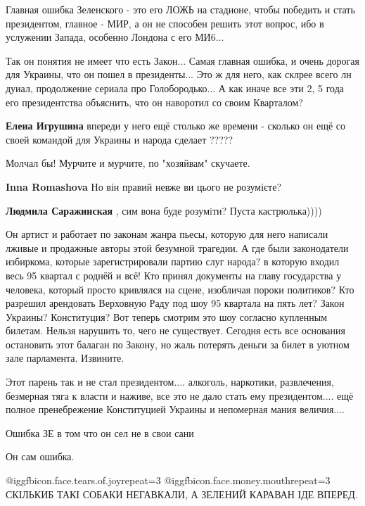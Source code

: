 \begin{itemize}
Главная ошибка Зеленского - это его ЛОЖЬ на стадионе, чтобы победить и стать
президентом, главное - МИР, а он не способен решить этот вопрос, ибо в
услужении Запада, особенно Лондона с его МИ6...


Так он понятия не имеет что есть Закон... Самая главная ошибка, и очень дорогая
для Украины, что он пошел в президенты... Это ж для него, как склрее всего лн
дуиал, продолжение сериала про Голобородько... А как иначе все эти 2, 5 года его
президентства объяснить, что он наворотил со своим Кварталом?

\begin{itemize} %
\textbf{Елена Игрушина} впереди у него ещё столько же времени - сколько он ещё со своей командой для Украины и народа сделает ?????
\end{itemize} %

Молчал бы! Мурчите и мурчите, по "хозяйвам" скучаете.

\begin{itemize} %
\textbf{Inna Romashova} Но він правий невже ви цього не розумієте?


\textbf{Людмила Саражинская} , сим вона буде розумiти? Пуста кастрюлька))))
\end{itemize} %


Он артист и работает по законам жанра пьесы, которую для него написали лживые и
продажные авторы этой безумной трагедии. А где были законодатели избиркома,
которые зарегистрировали партию слуг народа? в которую входил весь 95 квартал с
роднёй и всё! Кто принял документы на главу государства у человека, который
просто кривлялся на сцене, изобличая пороки политиков? Кто разрешил арендовать
Верховную Раду под шоу 95 квартала на пять лет? Закон Украины? Конституция? Вот
теперь смотрим это шоу согласно купленным билетам. Нельзя нарушить то, чего не
существует. Сегодня есть все основания остановить этот балаган по Закону, но
жаль потерять деньги за билет в уютном зале парламента. Извините.



Этот парень так и не стал президентом.... алкоголь, наркотики, развлечения,
безмерная тяга к власти и наживе, все это не дало стать ему президентом.... ещё
полное пренебрежение Конституцией Украины и непомерная мания величия....

Ошибка ЗЕ в том что он сел не в свои сани

Он сам ошибка.


 @igg{fbicon.face.tears.of.joy}{repeat=3}
 @igg{fbicon.face.money.mouth}{repeat=3} СКІЛЬКИБ ТАКІ СОБАКИ НЕГАВКАЛИ, А
 ЗЕЛЕНИЙ КАРАВАН ІДЕ ВПЕРЕД.


\end{itemize} %

